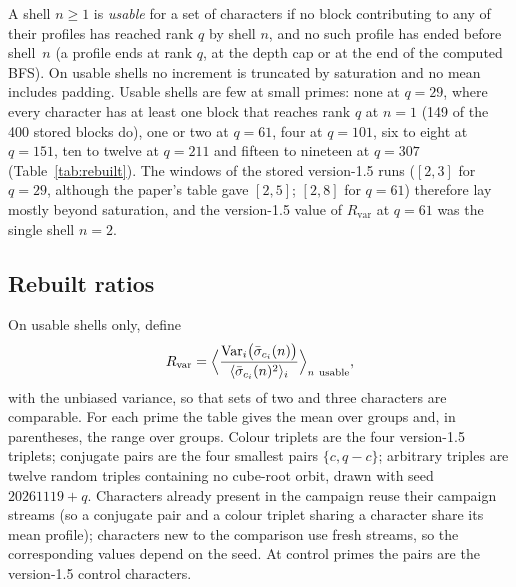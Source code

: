 \documentclass[12pt,a4paper]{article}
\theoremstyle{definition}
\theoremstyle{remark}
\newcommand{\Rvar}{R_{\mathrm{var}}}
\begin{document}
    A shell $n\geq1$ is \emph{usable} for a set of characters if no block contributing to any of
    their profiles has reached rank $q$ by shell $n$, and no such profile has ended before shell~$n$
    (a profile ends at rank $q$, at the depth cap or at the end of the computed BFS).
    On usable shells no increment is truncated by saturation and no mean includes padding.
    Usable shells are few at small primes: none at $q=29$, where every character has at least one
    block that reaches rank $q$ at $n=1$ (149 of the 400 stored blocks do), one
    or two at $q=61$, four at $q=101$, six to eight at $q=151$, ten to twelve at $q=211$ and fifteen to
    nineteen at $q=307$ (Table~\ref{tab:rebuilt}).
    The windows of the stored version-1.5 runs ($[2,3]$ for $q=29$, although the paper's table gave $[2,5]$;
    $[2,8]$ for $q=61$) therefore lay mostly beyond saturation, and the version-1.5 value of $\Rvar$ at $q=61$
    was the single shell $n=2$.

  \subsection{Rebuilt ratios}

    On usable shells only, define
    \[
      \Rvar=\Bigl\langle
      \frac{\operatorname{Var}_i\bigl(\bar\sigma_{c_i}(n)\bigr)}{\langle\bar\sigma_{c_i}(n)^2\rangle_i}
      \Bigr\rangle_{n\ \mathrm{usable}},
    \]
    with the unbiased variance, so that sets of two and three characters are comparable.
    For each prime the table gives the mean over groups and, in parentheses, the range over groups.
    Colour triplets are the four version-1.5 triplets; conjugate pairs are the four smallest pairs
    $\{c,q-c\}$; arbitrary triples are twelve random triples containing no cube-root orbit, drawn with seed
    $20261119+q$.
    Characters already present in the campaign reuse their campaign streams (so a conjugate pair and a colour
    triplet sharing a character share its mean profile); characters new to the comparison use fresh streams,
    so the corresponding values depend on the seed.
    At control primes the pairs are the version-1.5 control characters.
\end{document}
